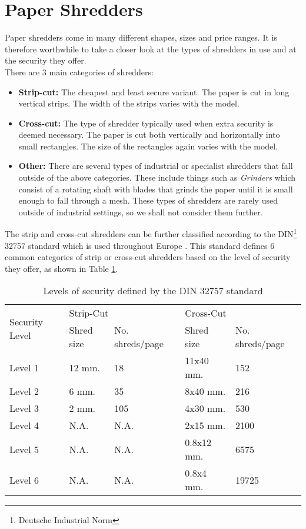 \section{Paper Shredders}
Paper shredders come in many different shapes, sizes and price ranges. It is therefore worthwhile to take a closer look at the types of shredders in use and at the security they offer. \\
There are 3 main categories of shredders:
\begin{itemize}
\item {\bf Strip-cut:} The cheapest and least secure variant. The paper is cut in long vertical strips. The width of the strips varies with the model.
\item {\bf Cross-cut:} The type of shredder typically used when extra security is deemed necessary. The paper is cut both vertically and horizontally into small rectangles. The size of the rectangles again varies with the model.
\item {\bf Other:} There are several types of industrial or specialist shredders that fall outside of the above categories. These include things such as \emph{Grinders} which consist of a rotating shaft with blades that grinds the paper until it is small enough to fall through a mesh. These types of shredders are rarely used outside of industrial settings, so we shall not consider them further.
\end{itemize}

The strip and cross-cut shredders can be further classified according to the DIN\footnote{Deutsche Industrial Norm} 32757 standard which is used throughout Europe \cite{P17}. This standard defines 6 common categories of strip or cross-cut shredders based on the level of security they offer, as shown in Table \ref{tab:din}.

\begin{table}[h]
  \centering
  \begin{tabular}{lllll}
    \toprule
    \multirow{2}{*}{Security Level} & \multicolumn{2}{l}{Strip-Cut} & \multicolumn{2}{l}{Cross-Cut} \\
    \cmidrule(r){2-3} 
    \cmidrule(r){4-5}
    & Shred size & No. shreds/page & Shred size & No. shreds/page \\
    \midrule
    Level 1 & 12 mm. & 18 & 11x40 mm. & 152 \\
    Level 2 & 6 mm. & 35 & 8x40 mm. & 216 \\
    Level 3 & 2 mm. & 105 & 4x30 mm. & 530 \\
    Level 4 & N.A. & N.A. & 2x15 mm. & 2100 \\
    Level 5 & N.A. & N.A. & 0.8x12 mm. & 6575 \\
    Level 6 & N.A. & N.A. & 0.8x4 mm. & 19725 \\
    \bottomrule
  \end{tabular}
  \caption{Levels of security defined by the DIN 32757 standard}
  \label{tab:din}
\end{table}

